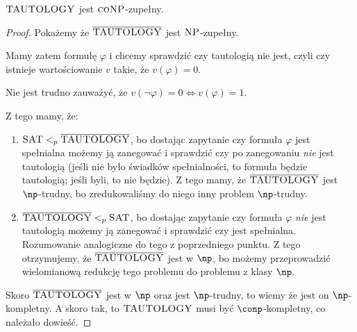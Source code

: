 \begin{theorem}
	\( \textsc{TAUTOLOGY} \) jest \( \textsc{coNP} \)-zupełny.
\end{theorem}
\begin{proof}
	Pokażemy że \( \overline{\textsc{TAUTOLOGY}} \) jest \( \textsc{NP} \)-zupełny.

	Mamy zatem formułę \( \varphi \) i chcemy sprawdzić czy tautologią nie jest, czyli czy istnieje wartościowanie \( v \) takie, że \( v(\varphi) = 0 \).

	Nie jest trudno zauważyć, że \( v(\lnot \varphi) = 0 \iff v(\varphi) = 1 \).

	Z tego mamy, że:

	\begin{enumerate}
		\item \( \textsc{SAT} <_p \overline{\textsc{TAUTOLOGY}}\), bo dostając zapytanie czy formuła \( \varphi \) jest spełnialna możemy ją zanegować i sprawdzić czy po zanegowaniu \textit{nie} jest tautologią (jeśli nie było świadków spełnialności, to formuła będzie tautologią; jeśli byli, to nie będzie). Z tego mamy, że \(\overline{\textsc{TAUTOLOGY}}\) jest \(\np\)-trudny, bo zredukowaliśmy do niego inny problem \(\np\)-trudny.
		\item \(\overline{\textsc{TAUTOLOGY}} <_p \textsc{SAT} \), bo dostając zapytanie czy formuła \( \varphi \) \textit{nie} jest tautologią możemy ją zanegować i sprawdzić czy jest spełnialna. Rozumowanie analogiczne do tego z poprzedniego punktu. Z tego otrzymujemy, że \(\overline{\textsc{TAUTOLOGY}}\) jest w \(\np\), bo możemy przeprowadzić wielomianową redukcję tego problemu do problemu z klasy \(\np\).
	\end{enumerate}

	Skoro \(\overline{\textsc{TAUTOLOGY}}\) jest w \(\np\) oraz jest \(\np\)-trudny, to wiemy że jest on \(\np\)-kompletny. A skoro tak, to \(\textsc{TAUTOLOGY}\) musi być \(\conp\)-kompletny, co należało dowieść.
\end{proof}